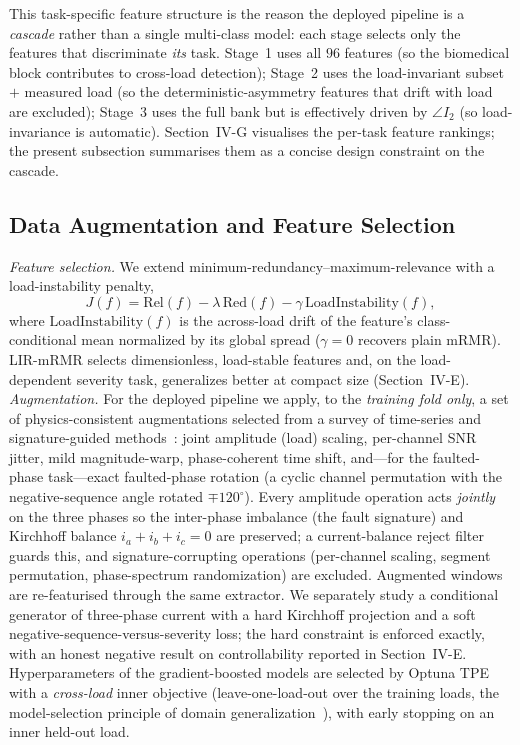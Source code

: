 \documentclass[journal]{IEEEtran}
\begin{document}
This task-specific feature structure is the reason the deployed pipeline is a
\emph{cascade} rather than a single multi-class model: each stage selects only the
features that discriminate \emph{its} task. Stage~1 uses all $96$ features (so the
biomedical block contributes to cross-load detection); Stage~2 uses the load-invariant
subset $+$ measured load (so the deterministic-asymmetry features that drift with load are
excluded); Stage~3 uses the full bank but is effectively driven by $\angle I_2$ (so
load-invariance is automatic). Section~IV-G visualises the per-task feature rankings; the
present subsection summarises them as a concise design constraint on the cascade.

\subsection{Data Augmentation and Feature Selection}
\emph{Feature selection.} We extend minimum-redundancy--maximum-relevance with a load-instability
penalty,
\begin{equation}
J(f)=\mathrm{Rel}(f)-\lambda\,\mathrm{Red}(f)-\gamma\,\mathrm{LoadInstability}(f),
\end{equation}
where $\mathrm{LoadInstability}(f)$ is the across-load drift of the feature's class-conditional mean
normalized by its global spread ($\gamma{=}0$ recovers plain mRMR). LIR-mRMR selects dimensionless,
load-stable features and, on the load-dependent severity task, generalizes better at compact size
(Section~IV-E). \emph{Augmentation.} For the deployed pipeline we apply, to the \emph{training fold
only}, a set of physics-consistent augmentations selected from a survey of time-series and
signature-guided methods~\cite{iwana2021,zhang2018mixup}: joint amplitude (load) scaling, per-channel
SNR jitter, mild magnitude-warp, phase-coherent time shift, and---for the faulted-phase task---exact
faulted-phase rotation (a cyclic channel permutation with the negative-sequence angle rotated
$\mp120^\circ$). Every amplitude operation acts \emph{jointly} on the three phases so the inter-phase
imbalance (the fault signature) and Kirchhoff balance $i_a+i_b+i_c=0$ are preserved; a current-balance
reject filter guards this, and signature-corrupting operations (per-channel scaling, segment
permutation, phase-spectrum randomization) are excluded. Augmented windows are re-featurised through the
same extractor. We separately study a conditional generator of three-phase current with a hard Kirchhoff
projection and a soft negative-sequence-versus-severity loss; the hard constraint is enforced exactly,
with an honest negative result on controllability reported in Section~IV-E. Hyperparameters of the
gradient-boosted models are selected by Optuna TPE~\cite{akiba2019} with a \emph{cross-load} inner
objective (leave-one-load-out over the training loads, the model-selection principle of domain
generalization~\cite{gulrajani2021}), with early stopping on an inner held-out load.
\end{document}
